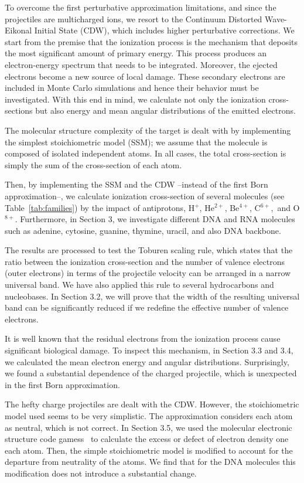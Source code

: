 \documentclass[preprint,12pt]{article}
\begin{document}
To overcome the first perturbative approximation limitations, and 
since the projectiles are multicharged ions, we resort to the 
Continuum Distorted Wave-Eikonal Initial State (CDW), which includes 
higher perturbative corrections. We start from the premise that the 
ionization process is the mechanism that deposits the most significant 
amount of primary energy. This process produces an electron-energy 
spectrum that needs to be integrated. Moreover, the ejected electrons 
become a new source of local damage. These secondary electrons are 
included in Monte Carlo simulations and hence their behavior must be
investigated. With this end in mind, we calculate not only the 
ionization cross-sections but also energy and mean angular distributions 
of the emitted electrons.

The molecular structure complexity of the target is dealt with by 
implementing the simplest stoichiometric model (SSM); we assume that 
the molecule is composed of isolated independent atoms. In all cases, 
the total cross-section is simply the sum of the cross-section of each 
atom.

Then, by implementing the SSM and the CDW --instead of the first Born 
approximation--, we calculate ionization cross-section of several 
molecules (see Table~\ref{tab:families}) by the impact of antiprotons,
H$^{+}$, He$^{2+}$, Be$^{4+}$, C$^{6+}$,\ and O$^{8+}$. Furthermore, 
in Section 3, we investigate different DNA and RNA molecules
such as adenine, cytosine, guanine, thymine, uracil, and also DNA 
backbone.

The results are processed to test the Toburen scaling rule, which 
states that the ratio between the ionization cross-section and the 
number of valence electrons (outer electrons) in terms of the 
projectile velocity can be arranged in a narrow universal band. 
We have also applied this rule to several hydrocarbons and nucleobases. 
In Section 3.2, we will prove that the width of the resulting universal 
band can be significantly reduced if we redefine the effective number 
of valence electrons.

It is well known that the residual electrons from the ionization 
process cause significant biological damage. To inspect this mechanism, 
in Section 3.3 and 3.4, we calculated the mean electron energy and
angular distributions. Surprisingly, we found a substantial dependence 
of the charged projectile, which is unexpected in the first Born 
approximation. 

The hefty charge projectiles are dealt with the CDW. However, the 
stoichiometric model used seems to be very simplistic. The approximation
considers each atom as neutral, which is not correct. In Section 3.5, 
we used the molecular electronic structure code 
{\sc gamess}~\cite{gamess} to calculate the excess or defect of 
electron density one each atom. Then, the simple stoichiometric model is
modified to account for the departure from neutrality of the atoms. 
We find that for the DNA molecules this modification does not introduce 
a substantial change.
\end{document}
